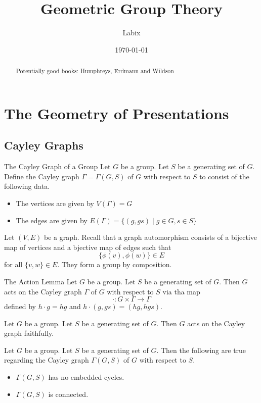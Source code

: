 \documentclass[a4paper]{article}
\title{Geometric Group Theory}
\author{Labix}
\date{\today}
\begin{document}
\maketitle
\begin{abstract}
Potentially good books: Humphreys, Erdmann and Wildson
\end{abstract}
\pagebreak
\tableofcontents

\pagebreak
\section{The Geometry of Presentations}
\subsection{Cayley Graphs}
\begin{defn}{The Cayley Graph of a Group}{} Let $G$ be a group. Let $S$ be a generating set of $G$. Define the Cayley graph $\Gamma=\Gamma(G,S)$ of $G$ with respect to $S$ to consist of the following data. 
\begin{itemize}
\item The vertices are given by $V(\Gamma)=G$
\item The edges are given by $E(\Gamma)=\{(g,gs)\;|\;g\in G,s\in S\}$
\end{itemize}
\end{defn}

Let $(V,E)$ be a graph. Recall that a graph automorphism consists of a bijective map of vertices and a bjective map of edges such that $$\{\phi(v),\phi(w)\}\in E$$ for all $\{v,w\}\in E$. They form a group by composition. 

\begin{lmm}{The Action Lemma}{} Let $G$ be a group. Let $S$ be a generating set of $G$. Then $G$ acts on the Cayley graph $\Gamma$ of $G$ with respect to $S$ via tha map $$\cdot:G\times\Gamma\to\Gamma$$ defined by $h\cdot g=hg$ and $h\cdot (g,gs)=(hg,hgs)$. 
\end{lmm}

\begin{lmm}{}{} Let $G$ be a group. Let $S$ be a generating set of $G$. Then $G$ acts on the Cayley graph faithfully. 
\end{lmm}

\begin{prp}{}{} Let $G$ be a group. Let $S$ be a generating set of $G$. Then the following are true regarding the Cayley graph $\Gamma(G,S)$ of $G$ with respect to $S$. 
\begin{itemize}
\item $\Gamma(G,S)$ has no embedded cycles. 
\item $\Gamma(G,S)$ is connected. 
\end{itemize}
\end{prp}
\end{document}
